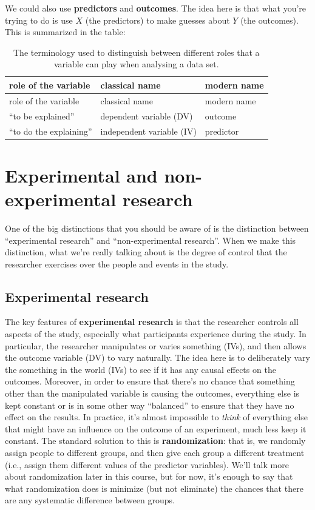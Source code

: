 \documentclass[
]{book}
\begin{document}
We could also use \textbf{predictors} and \textbf{outcomes}. The idea here is that what you're trying to do is use \(X\) (the predictors) to make guesses about \(Y\) (the outcomes). This is summarized in the table:

\begin{longtable}[]{@{}lll@{}}
\caption{The terminology used to distinguish between different roles that a variable can play when analysing a data set.}\tabularnewline
\toprule
role of the variable & classical name & modern name\tabularnewline
\midrule
\endfirsthead
\toprule
role of the variable & classical name & modern name\tabularnewline
\midrule
\endhead
``to be explained'' & dependent variable (DV) & outcome\tabularnewline
``to do the explaining'' & independent variable (IV) & predictor\tabularnewline
\bottomrule
\end{longtable}

\hypertarget{experimental-and-non-experimental-research}{%
\section{Experimental and non-experimental research}\label{experimental-and-non-experimental-research}}

One of the big distinctions that you should be aware of is the distinction between ``experimental research'' and ``non-experimental research''. When we make this distinction, what we're really talking about is the degree of control that the researcher exercises over the people and events in the study.

\hypertarget{experimental-research}{%
\subsection{Experimental research}\label{experimental-research}}

The key features of \textbf{experimental research} is that the researcher controls all aspects of the study, especially what participants experience during the study. In particular, the researcher manipulates or varies something (IVs), and then allows the outcome variable (DV) to vary naturally. The idea here is to deliberately vary the something in the world (IVs) to see if it has any causal effects on the outcomes. Moreover, in order to ensure that there's no chance that something other than the manipulated variable is causing the outcomes, everything else is kept constant or is in some other way ``balanced'' to ensure that they have no effect on the results. In practice, it's almost impossible to {\emph{think}} of everything else that might have an influence on the outcome of an experiment, much less keep it constant. The standard solution to this is \textbf{randomization}: that is, we randomly assign people to different groups, and then give each group a different treatment (i.e., assign them different values of the predictor variables). We'll talk more about randomization later in this course, but for now, it's enough to say that what randomization does is minimize (but not eliminate) the chances that there are any systematic difference between groups.
\end{document}
